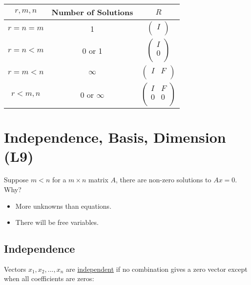 \documentclass[12pt]{article}
\begin{document}
\begin{center}
  \begin{tabular}{|c|c|c|}
    \hline
    $r,m,n$ & Number of Solutions & $R$ \\ \hline
    $r=n=m$ & 1 & 
    $\left(\begin{matrix}
        I\\
    \end{matrix}\right)$ \\ \hline
    $r=n<m$ & 0 or 1 &
    $\left(\begin{matrix}
        I\\
        0\\
    \end{matrix}\right)$ \\ \hline
    $r=m<n$ & $\infty$ &
    $\left(\begin{matrix}
        I & F\\
    \end{matrix}\right)$ \\ \hline
    $r<m,n$ & 0 or $\infty$ &    
    $\left(\begin{matrix}
        I & F\\
        0 & 0\\
    \end{matrix}\right)$ \\ \hline
  \end{tabular}
\end{center}

\newpage

\section{Independence, Basis, Dimension (L9)}

Suppose $m<n$ for a $m\times{n}$ matrix $A$, there are non-zero solutions to $Ax=0$. Why?

\begin{itemize}
    \item More unknowns than equations.
    \item There will be free variables.
\end{itemize}

\subsection{Independence}

Vectors $x_1,x_2,...,x_n$ are \underline{independent} if no combination gives a zero vector except when all coefficients are zeros:
\end{document}
